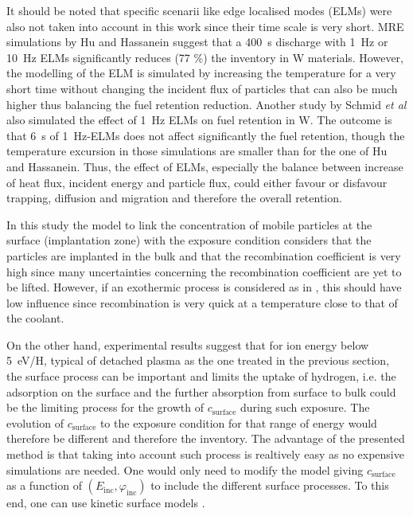 It should be noted that specific scenarii like edge localised modes (ELMs) were also not taken into account in this work since their time scale is very short.
MRE simulations by Hu and Hassanein  suggest that a \SI{400}{s} discharge with \SI{1}{Hz} or \SI{10}{Hz} ELMs significantly reduces (77 \%) the inventory in W materials.
However, the modelling of the ELM is simulated by increasing the temperature for a very short time without changing the incident flux of particles that can also be much higher thus balancing the fuel retention reduction.
Another study by Schmid \textit{et al}  also simulated the effect of \SI{1}{Hz} ELMs on fuel retention in W.
The outcome is that \SI{6}{s} of \SI{1}{Hz}-ELMs does not affect significantly the fuel retention, though the temperature excursion in those simulations are smaller than for the one of Hu and Hassanein.
Thus, the effect of ELMs, especially the balance between increase of heat flux, incident energy and particle flux, could either favour or disfavour trapping, diffusion and migration and therefore the overall retention.

In this study the model to link the concentration of mobile particles at the surface (implantation zone) with the exposure condition considers that the particles are implanted in the bulk and that the recombination coefficient is very high since many uncertainties concerning the recombination coefficient are yet to be lifted.
However, if an exothermic process is considered as in , this should have low influence since recombination is very quick at a temperature close to that of the coolant.

On the other hand, experimental results  suggest that for ion energy below \SI{5}{eV/H}, typical of detached plasma as the one treated in the previous section, the surface process can be important and limits the uptake of hydrogen, i.e. the adsorption on the surface and the further absorption from surface to bulk could be the limiting process for the growth of $c_\mathrm{surface}$ during such exposure.
The evolution of $c_\mathrm{surface}$ to the exposure condition for that range of energy would therefore be different and therefore the inventory.
The advantage of the presented method is that taking into account such process is realtively easy as no expensive simulations are needed.
One would only need to modify the model giving $c_\mathrm{surface}$
as a function of $(E_\mathrm{inc},\varphi_\mathrm{inc})$ to include the different surface processes.
To this end, one can use kinetic surface models .

